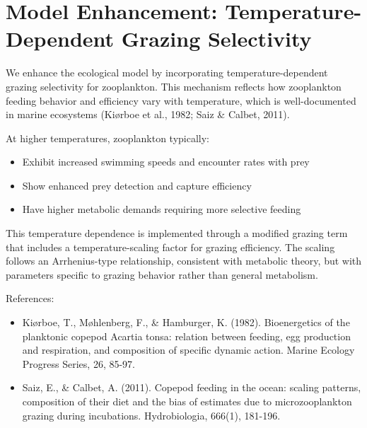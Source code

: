 \section{Model Enhancement: Temperature-Dependent Grazing Selectivity}

We enhance the ecological model by incorporating temperature-dependent grazing selectivity for zooplankton. This mechanism reflects how zooplankton feeding behavior and efficiency vary with temperature, which is well-documented in marine ecosystems (Kiørboe et al., 1982; Saiz & Calbet, 2011).

At higher temperatures, zooplankton typically:
\begin{itemize}
\item Exhibit increased swimming speeds and encounter rates with prey
\item Show enhanced prey detection and capture efficiency
\item Have higher metabolic demands requiring more selective feeding
\end{itemize}

This temperature dependence is implemented through a modified grazing term that includes a temperature-scaling factor for grazing efficiency. The scaling follows an Arrhenius-type relationship, consistent with metabolic theory, but with parameters specific to grazing behavior rather than general metabolism.

References:
\begin{itemize}
\item Kiørboe, T., Møhlenberg, F., & Hamburger, K. (1982). Bioenergetics of the planktonic copepod Acartia tonsa: relation between feeding, egg production and respiration, and composition of specific dynamic action. Marine Ecology Progress Series, 26, 85-97.
\item Saiz, E., & Calbet, A. (2011). Copepod feeding in the ocean: scaling patterns, composition of their diet and the bias of estimates due to microzooplankton grazing during incubations. Hydrobiologia, 666(1), 181-196.
\end{itemize}
